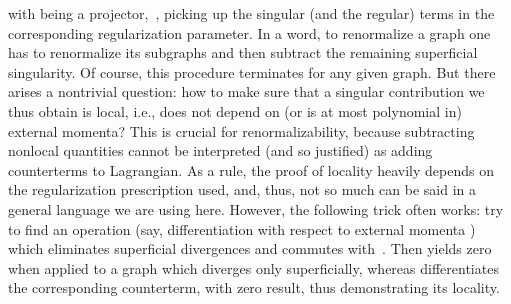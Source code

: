 \documentclass[a4paper,12pt]{article}
\begin{document}
with \coordHE{} being a projector, \coordHE{}\,, picking up the singular
(and \coordHE{} the regular) terms in the corresponding regularization
parameter. In a word, to renormalize a graph one has to renormalize its
subgraphs and then subtract the remaining superficial singularity.
Of course, this procedure terminates for any given graph. But there arises a
nontrivial question: how to make sure that a singular contribution we thus
obtain is local, i.e., does not depend on (or is at most polynomial in)
external momenta? This is crucial for renormalizability, because subtracting
nonlocal quantities cannot be interpreted (and so justified) as adding
counterterms to Lagrangian. As a rule, the proof of locality heavily depends
on the regularization prescription used, and, thus, not so much
can be said in a general language we are using here. However, the following
trick often works: try to find an operation \coordHE{} (say, differentiation
with respect to external momenta \cite{Co}) which eliminates
superficial divergences and commutes with \coordHE{}\,. Then \coordHE{}
yields zero when applied to a graph which diverges only superficially,
whereas \coordHE{} differentiates the corresponding counterterm, with zero
result, thus demonstrating its locality.
\end{document}
